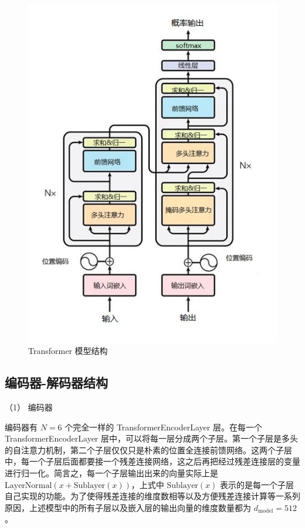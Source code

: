 \begin{figure}[htbp]
	\centering
	\includegraphics[scale = 0.8]{figures/Transformer2}
	\caption{Transformer 模型结构}
	\label{fig:Transformer2}
\end{figure}

\subsection{编码器-解码器结构}

（1） 编码器

编码器有 $N=6$ 个完全一样的 TransformerEncoderLayer 层。在每一个 TransformerEncoderLayer 层中，可以将每一层分成两个子层。第一个子层是多头的自注意力机制，第二个子层仅仅只是朴素的位置全连接前馈网络。这两个子层中，每一个子层后面都要接一个残差连接网络，这之后再把经过残差连接层的变量进行归一化。简言之，每一个子层输出出来的向量实际上是 $\text{LayerNormal}(x + \text{Sublayer}(x))$，上式中 $\text{Sublayer}(x)$ 表示的是每一个子层自己实现的功能。为了使得残差连接的维度数相等以及方便残差连接计算等一系列原因，上述模型中的所有子层以及嵌入层的输出向量的维度数量都为 $d_{\text{model}} = 512$。

